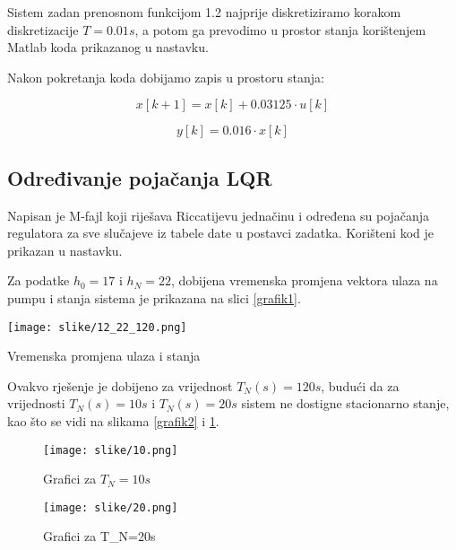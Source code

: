 Sistem zadan prenosnom funkcijom 1.2 najprije diskretiziramo korakom diskretizacije $T = 0.01 s$, a potom ga prevodimo u prostor stanja korištenjem Matlab koda prikazanog u nastavku.



Nakon pokretanja koda dobijamo zapis u prostoru stanja:

\begin{equation}
    x[k + 1] = x[k] + 0.03125 \cdot u[k]
\end{equation}

\begin{equation}
    y[k] = 0.016 \cdot x[k]
\end{equation}


\subsection{Određivanje pojačanja LQR}
Napisan je M-fajl koji riješava Riccatijevu jednačinu i određena su pojačanja regulatora za sve
slučajeve iz tabele date u postavci zadatka. Korišteni kod je prikazan u nastavku.


\noindent Za podatke $h_0=17$ i $h_N=22$, dobijena vremenska promjena vektora ulaza na pumpu i stanja sistema je prikazana na slici \ref{grafik1}.

\begin{center}
    \captionsetup{type=figure}
    \begin{center}
        \texttt{[image: slike/12\_22\_120.png]}
        \caption{Vremenska promjena ulaza i stanja}
        \label{grafik1}
    \end{center}
\end{center}

Ovakvo rješenje je dobijeno za vrijednost $T_N(s)=120s$, budući da za vrijednosti $T_N(s)=10s$ i $T_N(s)=20s$ sistem ne dostigne stacionarno stanje, kao što se vidi na slikama \ref{grafik2} i \ref{grafik3}.

\begin{figure}[H]
  \centering
  \begin{minipage}[b]{0.47\textwidth}
    \texttt{[image: slike/10.png]}
    \caption{Grafici za $T_N=10s$}
    \label{grafik2}
  \end{minipage}
  \hfill
  \begin{minipage}[b]{0.47\textwidth}
    \texttt{[image: slike/20.png]}
    \caption{Grafici za T_N=20s}
    \label{grafik3}
  \end{minipage}
\end{figure}

